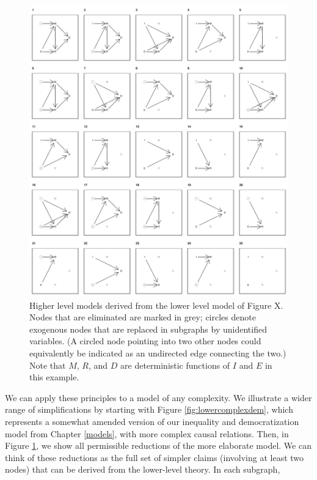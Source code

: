 \documentclass[12pt,]{book}
\begin{document}
\begin{figure}
\centering
\includegraphics{ii_files/figure-latex/runningsubs-1.pdf}
\caption{\label{fig:runningsubs}Higher level models derived from the lower level model of Figure X. Nodes that are eliminated are marked in grey; circles denote exogenous nodes that are replaced in subgraphs by unidentified variables. (A circled node pointing into two other nodes could equivalently be indicated as an undirected edge connecting the two.) Note that \(M\), \(R\), and \(D\) are deterministic functions of \(I\) and \(E\) in this example.}
\end{figure}

We can apply these principles to a model of any complexity. We illustrate a wider range of simplifications by starting with Figure \ref{fig:lowercomplexdem}, which represents a somewhat amended version of our inequality and democratization model from Chapter \ref{models}, with more complex causal relations. Then, in Figure \ref{fig:runningsubs}, we show all permissible reductions of the more elaborate model. We can think of these reductions as the full set of simpler claims (involving at least two nodes) that can be derived from the lower-level theory. In each subgraph,
\end{document}
